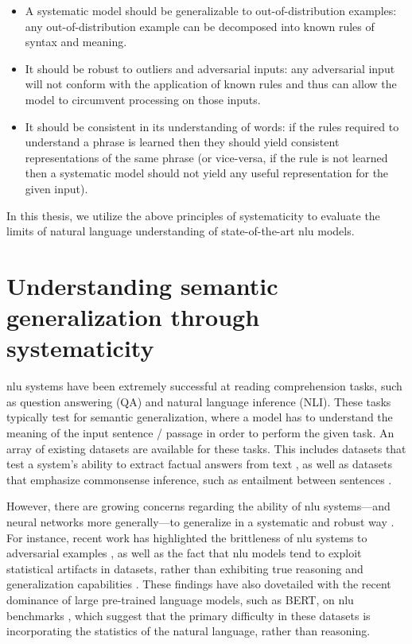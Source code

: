 \documentclass[letterpaper, 12pt]{report}
\begin{document}
\begin{itemize}
  \item A systematic model should be generalizable to out-of-distribution examples: any out-of-distribution example can be decomposed into known rules of syntax and meaning.
  \item It should be robust to outliers and adversarial inputs: any adversarial input will not conform with the application of known rules and thus can allow the model to circumvent processing on those inputs.
  \item It should be consistent in its understanding of words: if the rules required to understand a phrase is learned then they should yield consistent representations of the same phrase (or vice-versa, if the rule is not learned then a systematic model should not yield any useful representation for the given input).
\end{itemize}

In this thesis, we utilize the above principles of systematicity to evaluate the limits of natural language understanding of state-of-the-art \acrshort{nlu} models.

\clearpage

\chapter{Understanding semantic generalization through systematicity}
\label{chap:clutrr}

\gls{nlu} systems have been extremely successful at reading comprehension tasks, such as question answering (QA) and natural language inference (NLI).
These tasks typically test for semantic generalization, where a model has to understand the meaning of the input sentence / passage in order to perform the given task.
An array of existing datasets are available for these tasks. This includes datasets that test a system's ability to extract factual answers from text \citep{rajpurkar-etal-2016-squad,Nguyen2016-ec,Trischler2016-fc,Mostafazadeh2016-hu,Su2016-so}, as well as datasets that emphasize commonsense inference, such as entailment between sentences \citep{bowman-etal-2015-large,williams-etal-2018-broad}.

However, there are growing concerns regarding the ability of \acrshort{nlu} systems---and neural networks more generally---to generalize in a systematic and robust way \citep{bahdanau2018systematic,Lake2018:SCAN,Johnson2016-mw}.
For instance, recent work has highlighted the brittleness of \acrshort{nlu} systems to adversarial examples \citep{jia-liang-2017-adversarial}, as well as the fact that \acrshort{nlu} models tend to exploit statistical artifacts in datasets, rather than exhibiting true reasoning and generalization capabilities \citep{gururangan-etal-2018-annotation,kaushik2018much}.
These findings have also dovetailed with the recent dominance of large pre-trained language models, such as BERT, on \acrshort{nlu} benchmarks \citep{devlin-etal-2019-bert,peters-etal-2018-deep}, which suggest that the primary difficulty in these datasets is incorporating the statistics of the natural language, rather than reasoning.
\end{document}
